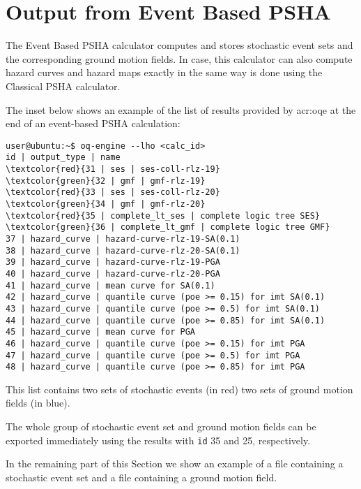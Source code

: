 \section{Output from Event Based PSHA}\label{EventBasedOutput}
%
The Event Based PSHA calculator computes and stores stochastic 
event sets and the corresponding ground motion fields. In case,
this calculator can also compute hazard curves and hazard maps
exactly in the same way is done using the Classical PSHA calculator.

The inset below shows an example of the list of results provided by 
\gls{acr:oqe} at the end of an event-based PSHA calculation:
%
\begin{Verbatim}[frame=single, commandchars=\\\{\}, fontsize=\small]
user@ubuntu:~$ oq-engine --lho <calc_id> 
id | output_type | name
\textcolor{red}{31 | ses | ses-coll-rlz-19}
\textcolor{green}{32 | gmf | gmf-rlz-19}
\textcolor{red}{33 | ses | ses-coll-rlz-20}
\textcolor{green}{34 | gmf | gmf-rlz-20}
\textcolor{red}{35 | complete_lt_ses | complete logic tree SES}
\textcolor{green}{36 | complete_lt_gmf | complete logic tree GMF}
37 | hazard_curve | hazard-curve-rlz-19-SA(0.1)
38 | hazard_curve | hazard-curve-rlz-20-SA(0.1)
39 | hazard_curve | hazard-curve-rlz-19-PGA
40 | hazard_curve | hazard-curve-rlz-20-PGA
41 | hazard_curve | mean curve for SA(0.1)
42 | hazard_curve | quantile curve (poe >= 0.15) for imt SA(0.1)
43 | hazard_curve | quantile curve (poe >= 0.5) for imt SA(0.1)
44 | hazard_curve | quantile curve (poe >= 0.85) for imt SA(0.1)
45 | hazard_curve | mean curve for PGA
46 | hazard_curve | quantile curve (poe >= 0.15) for imt PGA
47 | hazard_curve | quantile curve (poe >= 0.5) for imt PGA
48 | hazard_curve | quantile curve (poe >= 0.85) for imt PGA
\end{Verbatim}
This list contains two sets of stochastic events (in red) two sets of ground motion fields (in blue).

The whole group of stochastic event set and ground motion fields can 
be exported immediately using the results with \texttt{id} 35 and 25,
respectively.

In the remaining part of this Section we show an example of a file
containing a stochastic event set and a file containing a ground 
motion field.

